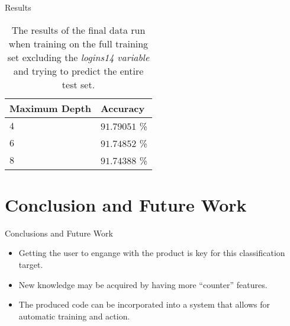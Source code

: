 \documentclass[12pt,aspectratio=1610]{beamer}
\newcommand{\graphicc}[4]{\begin{figure}[H] \centering
            \texttt{[image: \{\#2]}}
            \caption{{#3}} \label{#4} \end{figure}}
\begin{document}

\begin{frame}{Results}
	\begin{table}[H]
	  \centering
	  \begin{tabular}{l|l}
	    \textbf{Maximum Depth} & \textbf{Accuracy} \\ \hline
	    $4$                    & $91.79051$ \%     \\
	    $6$                    & $91.74852$ \%     \\
	    $8$                    & $91.74388$ \%
	  \end{tabular}
	  \caption{The results of the final data run when training on the full training
	    set excluding the \textit{logins14 variable} and trying to predict the
	    entire test set.}
	  \label{tab:results01}
	\end{table}
\end{frame}


\section{Conclusion and Future Work}

\begin{frame}{Conclusions and Future Work}
	\begin{itemize}
		\item Getting the user to engange with the product is key for this classification target.
		\item New knowledge may be acquired by having more ``counter'' features.
		\item The produced code can be incorporated into a system that allows for automatic training and action.
	\end{itemize}
\end{frame}
\end{document}
